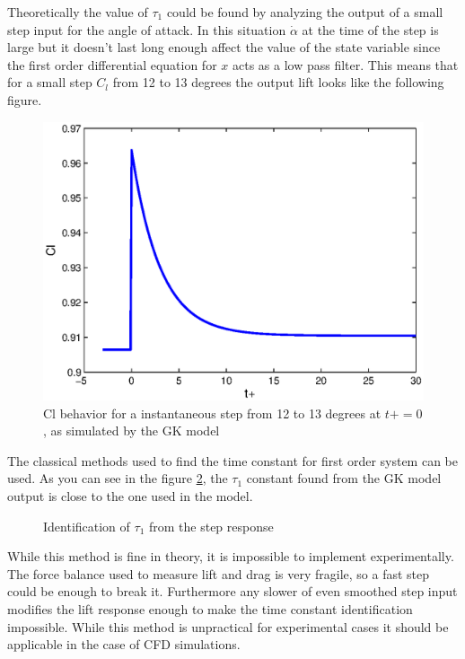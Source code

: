 \par Theoretically the value of $\tau_1$ could be found by analyzing the output of a small step input for the angle of attack.
In this situation $\dot{\alpha}$ at the time of the step is large but it doesn't last long enough affect the value of the state variable since the first order differential equation for $x$ acts as a low pass filter.
This means that for a small step $C_l$ from 12 to 13 degrees the output lift looks like the following figure.

\begin{figure}[h]
  \centering
  \includegraphics{./Figures/Cl_vs_tplus_step_12to13.eps}
  \caption{Cl behavior for a instantaneous step from 12 to 13 degrees at $t+=0$, as simulated by the GK model}
  \label{fig:Cl_for_alpha_step}
\end{figure}

\par The classical methods used to find the time constant for first order system can be used.
As you can see in the figure \ref{fig:tau_1_identification}, the $\tau_1$ constant found from the GK model output is close to the one used in the model.

\begin{figure}[h]
  \centering
  \caption{Identification of $\tau_1$ from the step response}
  \label{fig:tau_1_identification}
\end{figure}	

\par While this method is fine in theory, it is impossible to implement experimentally.
The force balance used to measure lift and drag is very fragile, so a fast step could be enough to break it.
Furthermore any slower of even smoothed step input modifies the lift response enough to make the time constant identification impossible.
While this method is unpractical for experimental cases it should be applicable in the case of CFD simulations.

